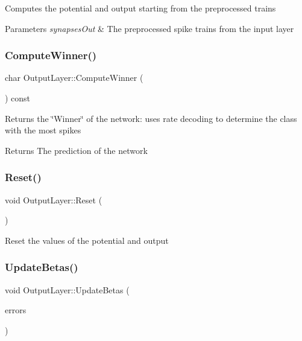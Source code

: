 Computes the potential and output starting from the preprocessed trains 
\begin{DoxyParams}{Parameters}
{\em synapses\+Out} & The preprocessed spike trains from the input layer \\
\hline
\end{DoxyParams}
\mbox{\label{class_output_layer_a0e64179945329c2a65fbc42f68f9945a}} 
\subsubsection{\texorpdfstring{Compute\+Winner()}{ComputeWinner()}}
{\footnotesize\ttfamily char Output\+Layer\+::\+Compute\+Winner (\begin{DoxyParamCaption}{ }\end{DoxyParamCaption}) const}

Returns the \char`\"{}\+Winner\char`\"{} of the network\+: uses rate decoding to determine the class with the most spikes \begin{DoxyReturn}{Returns}
The prediction of the network 
\end{DoxyReturn}
\mbox{\label{class_output_layer_aba802a4e6d257f69d4cb2951e74bbeca}} 
\subsubsection{\texorpdfstring{Reset()}{Reset()}}
{\footnotesize\ttfamily void Output\+Layer\+::\+Reset (\begin{DoxyParamCaption}{ }\end{DoxyParamCaption})}

Reset the values of the potential and output \mbox{\label{class_output_layer_a48c40aafb9681f4a3464aa4a5a5fa83d}} 
\subsubsection{\texorpdfstring{Update\+Betas()}{UpdateBetas()}}
{\footnotesize\ttfamily void Output\+Layer\+::\+Update\+Betas (\begin{DoxyParamCaption}\item[{array$<$ array$<$ double, \mbox{\hyperlink{_constants_8h_a6108cec236ef7a2e1d3259931de87186}{T}} $>$, \mbox{\hyperlink{_constants_8h_a12148c0e36153a905f4f6ef1afdbb27e}{C\+L\+A\+S\+S\+ES}} $>$ \&}]{errors }\end{DoxyParamCaption})}

